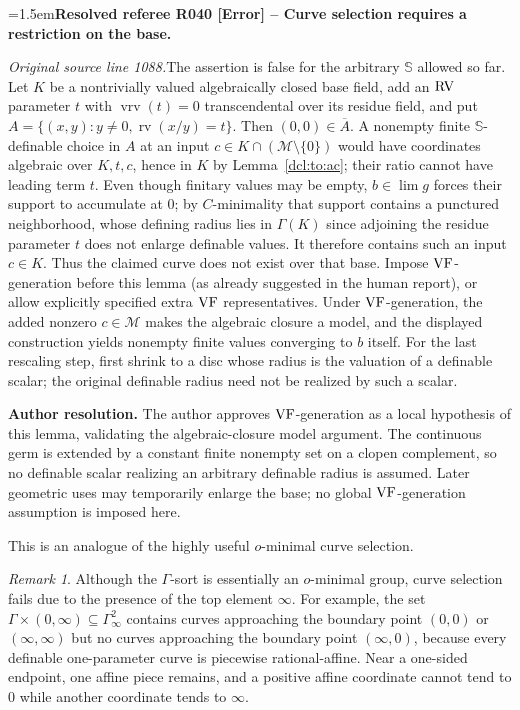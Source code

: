 \documentclass[12pt]{amsart}
\newcommand{\ResolvedRefereeRemark}[5]{%
  \par\medskip\begingroup\normalfont\small\color{gray}%
  \emergencystretch=1.5em\noindent\textbf{Resolved referee R#1 [#2] -- #3.}\par\nobreak\noindent #4\par
  \medskip\color{ResolutionGreen}\noindent\textbf{Author resolution.} #5\par
  \endgroup\medskip
}
\theoremstyle{plain}
\theoremstyle{definition}
\theoremstyle{remark}
\newtheorem{rem}[thm]{Remark}
\numberwithin{equation}{section}
\theoremstyle{plain}
\newcommand{\VF}{\textup{VF}}
\newcommand{\RV}{\textup{RV}}
\newcommand{\MM}{\mdl M}
\newcommand{\omin}{$o$\nobreakdash}
\newcommand{\0}{\emptyset}
\newcommand{\mdl}[1]{\mathcal{#1}}  %
\newcommand{\sub}{\subseteq}
\DeclareMathOperator{\rv}{rv}
\DeclareMathOperator{\vrv}{vrv}
\begin{document}
\ResolvedRefereeRemark{040}{Error}{Curve selection requires a restriction on the base}{%
\textit{Original source line 1088.}\quad The assertion is false for the arbitrary $\mathbb S$ allowed so far. Let $K$ be a nontrivially valued algebraically closed base field, add an $\RV$ parameter $t$ with $\vrv(t)=0$ transcendental over its residue field, and put $A=\{(x,y):y\ne0,\rv(x/y)=t\}$. Then $(0,0)\in\overline A$. A nonempty finite $\mathbb S$-definable choice in $A$ at an input $c\in K\cap(\MM\setminus\{0\})$ would have coordinates algebraic over $K,t,c$, hence in $K$ by Lemma~\ref{dcl:to:ac}; their ratio cannot have leading term $t$. Even though finitary values may be empty, $b\in\lim g$ forces their support to accumulate at $0$; by $C$-minimality that support contains a punctured neighborhood, whose defining radius lies in $\Gamma(K)$ since adjoining the residue parameter $t$ does not enlarge definable values. It therefore contains such an input $c\in K$. Thus the claimed curve does not exist over that base. Impose $\VF$-generation before this lemma (as already suggested in the human report), or allow explicitly specified extra $\VF$ representatives. Under $\VF$-generation, the added nonzero $c\in\MM$ makes the algebraic closure a model, and the displayed construction yields nonempty finite values converging to $b$ itself. For the last rescaling step, first shrink to a disc whose radius is the valuation of a definable scalar; the original definable radius need not be realized by such a scalar.
}{The author approves $\VF$-generation as a local hypothesis of this lemma, validating the algebraic-closure model argument. The continuous germ is extended by a constant finite nonempty set on a clopen complement, so no definable scalar realizing an arbitrary definable radius is assumed. Later geometric uses may temporarily enlarge the base; no global $\VF$-generation assumption is imposed here.}

This is an analogue of the highly useful \omin-minimal curve selection.

\begin{rem}
Although the $\Gamma$-sort is essentially an \omin-minimal group, curve selection fails due to the presence of the top element $\infty$. For example, the set $\Gamma \times (0, \infty) \sub  \Gamma^2_\infty$ contains curves approaching the boundary point $(0, 0)$ or $(\infty, \infty)$ but no curves approaching the boundary point $(\infty, 0)$, because every definable one-parameter curve is piecewise rational-affine. Near a one-sided endpoint, one affine piece remains, and a positive affine coordinate cannot tend to $0$ while another coordinate tends to $\infty$.
\end{rem}
\end{document}
